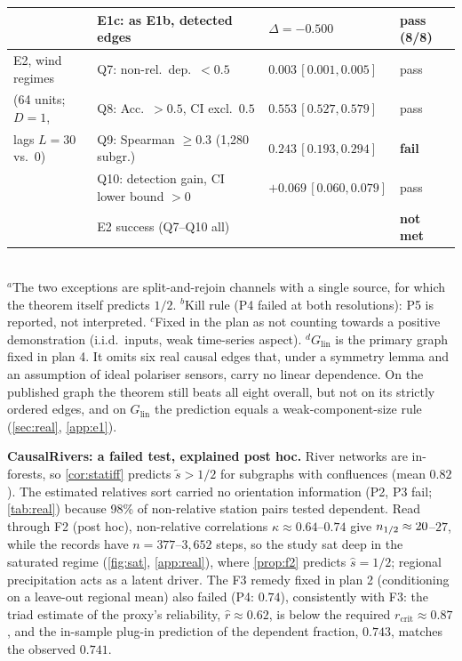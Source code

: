 \begin{table}[h]
\begin{tabular}{llll}
 & E1c: as E1b, detected edges & $\Delta=-0.500$ & pass (8/8) \\
\midrule
E2, wind regimes & Q7: non-rel.\ dep.\ $<0.5$ & $0.003\,[0.001,0.005]$ & pass \\
(64 units; $D{=}1$, & Q8: Acc.\ $>0.5$, CI excl.\ $0.5$ & $0.553\,[0.527,0.579]$ & pass \\
lags $L{=}30$ vs.\ 0) & Q9: Spearman $\ge0.3$ (1,280 subgr.) & $0.243\,[0.193,0.294]$ & \textbf{fail} \\
 & Q10: detection gain, CI lower bound $>0$ & $+0.069\,[0.060,0.079]$ & pass \\
 & E2 success (Q7--Q10 all) & & \textbf{not met} \\
\bottomrule
\end{tabular}
\\[2pt]
{\footnotesize $^a$The two exceptions are split-and-rejoin channels with a
single source, for which the theorem itself predicts $1/2$.
$^b$Kill rule (P4 failed at both resolutions): P5 is reported, not
interpreted. $^c$Fixed in the plan as not counting towards a positive
demonstration (i.i.d.\ inputs, weak time-series aspect).
$^d$$G_{\mathrm{lin}}$ is the primary graph fixed in plan 4. It omits six real causal edges
that, under a symmetry lemma and an assumption of ideal polariser sensors, carry no linear dependence.
On the published graph the theorem still beats all eight overall, but not on its strictly
ordered edges, and on $G_{\mathrm{lin}}$ the prediction equals a weak-component-size rule (\cref{sec:real}, \cref{app:e1}).}
\vskip -0.1in
\end{table}
\textbf{CausalRivers: a failed test, explained post hoc.} River networks
are in-forests, so \cref{cor:statiff} predicts $\tilde s>1/2$ for subgraphs
with confluences (mean $0.82$). The estimated relatives sort carried no
orientation information (P2, P3 fail; \cref{tab:real}) because 98\% of
non-relative station pairs tested dependent. Read through F2 (post hoc),
non-relative correlations $\kappa\approx0.64$--$0.74$ give
$n_{1/2}\approx20$--$27$, while the records have $n=377$--$3{,}652$ steps, so the
study sat deep in the saturated regime (\cref{fig:sat}, \cref{app:real}),
where \cref{prop:f2} predicts $\hat s=1/2$; regional precipitation acts as a
latent driver. The F3 remedy fixed in plan 2 (conditioning on a leave-out
regional mean) also failed (P4: $0.74$), consistently with F3: the triad
estimate of the proxy's reliability, $\hat r\approx0.62$, is below the required
$r_{\mathrm{crit}}\approx0.87$, and the in-sample plug-in prediction of the
dependent fraction, $0.743$, matches the observed $0.741$.

